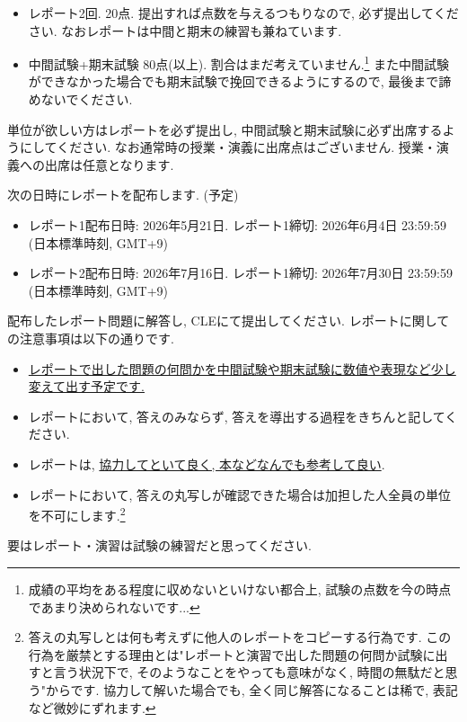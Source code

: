 \documentclass[dvipdfmx,a4paper,11pt]{article} %
\theoremstyle{definition}
\begin{document}
\begin{tcolorbox}[mybox]
\begin{itemize}
\item レポート2回. 20点. 提出すれば点数を与えるつもりなので, 必ず提出してください. なおレポートは中間と期末の練習も兼ねています.
\item 中間試験+期末試験 80点(以上). 割合はまだ考えていません.\footnote{成績の平均をある程度に収めないといけない都合上, 試験の点数を今の時点であまり決められないです...} また中間試験ができなかった場合でも期末試験で挽回できるようにするので, 最後まで諦めないでください. 
\end{itemize}
\end{tcolorbox}

単位が欲しい方はレポートを必ず提出し, 中間試験と期末試験に必ず出席するようにしてください. 
なお通常時の授業・演義に出席点はございません. 授業・演義への出席は任意となります. 

\medskip
{}

次の日時にレポートを配布します. (予定)


\begin{tcolorbox}[mybox]
\begin{itemize}
  \setlength{\parskip}{0cm} 
  \setlength{\itemsep}{0cm}
\item レポート1配布日時: 2026年5月21日. レポート1締切: 2026年6月4日 23:59:59 (日本標準時刻, GMT+9)
\item レポート2配布日時: 2026年7月16日. レポート1締切: 2026年7月30日 23:59:59 (日本標準時刻, GMT+9)
\end{itemize}
\end{tcolorbox}


配布したレポート問題に解答し, CLEにて提出してください. レポートに関しての注意事項は以下の通りです. 

\newpage
\begin{itemize}
  \setlength{\parskip}{0cm} 
  \setlength{\itemsep}{0cm}
\item \underline{レポートで出した問題の何問かを中間試験や期末試験に数値や表現など少し変えて出す予定です.} 
\item レポートにおいて, 答えのみならず, 答えを導出する過程をきちんと記してください. 
\item レポートは, \underline{協力してといて良く, 本などなんでも参考して良い}.
\item レポートにおいて, 答えの丸写しが確認できた場合は加担した人全員の単位を不可にします.\footnote{答えの丸写しとは何も考えずに他人のレポートをコピーする行為です. この行為を厳禁とする理由とは"レポートと演習で出した問題の何問か試験に出すと言う状況下で, そのようなことをやっても意味がなく, 時間の無駄だと思う"からです. 協力して解いた場合でも, 全く同じ解答になることは稀で, 表記など微妙にずれます. }
\end{itemize}
\vspace{-12pt}
要はレポート・演習は試験の練習だと思ってください.
\end{document}
